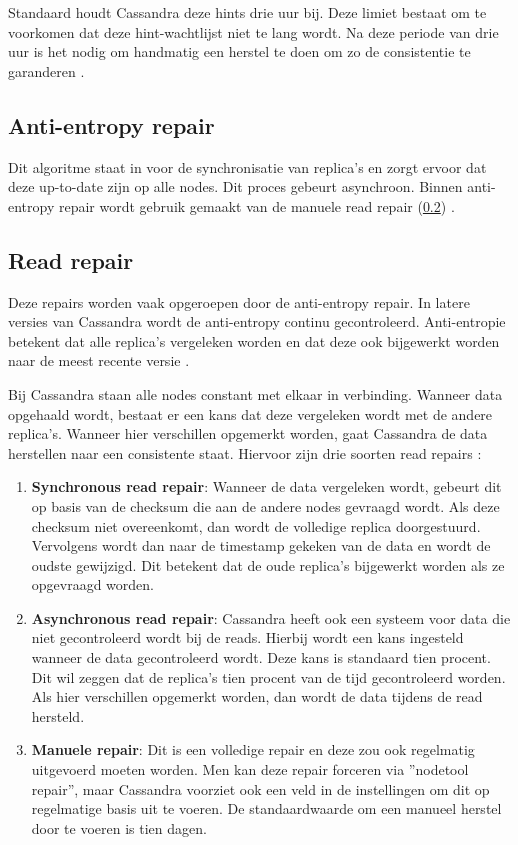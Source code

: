 Standaard houdt Cassandra deze hints drie uur bij.
Deze limiet bestaat om te voorkomen dat deze hint-wachtlijst niet te lang wordt.
Na deze periode van drie uur is het nodig om handmatig een herstel te doen om zo de consistentie te garanderen \citep{strickland2014availability}.

\subsection{Anti-entropy repair}
Dit algoritme staat in voor de synchronisatie van replica's en zorgt ervoor dat deze up-to-date zijn op alle nodes.
Dit proces gebeurt asynchroon.
Binnen anti-entropy repair wordt gebruik gemaakt van de manuele read repair (\ref{sec:read_repair}) \citep{strickland2014availability}.

\subsection{Read repair}
\label{sec:read_repair}
Deze repairs worden vaak opgeroepen door de anti-entropy repair.
In latere versies van Cassandra wordt de anti-entropy continu gecontroleerd.
Anti-entropie betekent dat alle replica's vergeleken worden en dat deze ook bijgewerkt worden naar de meest recente versie \citep{Kunz2013Entropy}.

Bij Cassandra staan alle nodes constant met elkaar in verbinding.
Wanneer data opgehaald wordt, bestaat er een kans dat deze vergeleken wordt met de andere replica's.
Wanneer hier verschillen opgemerkt worden, gaat Cassandra de data herstellen naar een consistente staat.
Hiervoor zijn drie soorten read repairs \citep{strickland2014availability}:

\begin{enumerate}
	\item \textbf{Synchronous read repair}:
	Wanneer de data vergeleken wordt, gebeurt dit op basis van de checksum die aan de andere nodes gevraagd wordt.
	Als deze checksum niet overeenkomt, dan wordt de volledige replica doorgestuurd.
	Vervolgens wordt dan naar de timestamp gekeken van de data en wordt de oudste gewijzigd.
	Dit betekent dat de oude replica's bijgewerkt worden als ze opgevraagd worden.
	
	\item \textbf{Asynchronous read repair}:
	Cassandra heeft ook een systeem voor data die niet gecontroleerd wordt bij de reads.
	Hierbij wordt een kans ingesteld wanneer de data gecontroleerd wordt.
	Deze kans is standaard tien procent.
	Dit wil zeggen dat de replica's tien procent van de tijd gecontroleerd worden.
	Als hier verschillen opgemerkt worden, dan wordt de data tijdens de read hersteld.
	
	\item \textbf{Manuele repair}:
	Dit is een volledige repair en deze zou ook regelmatig uitgevoerd moeten worden.
	Men kan deze repair forceren via ''nodetool repair'', maar Cassandra voorziet ook een veld in de instellingen om dit op regelmatige basis uit te voeren.
	De standaardwaarde om een manueel herstel door te voeren is tien dagen.
\end{enumerate}

